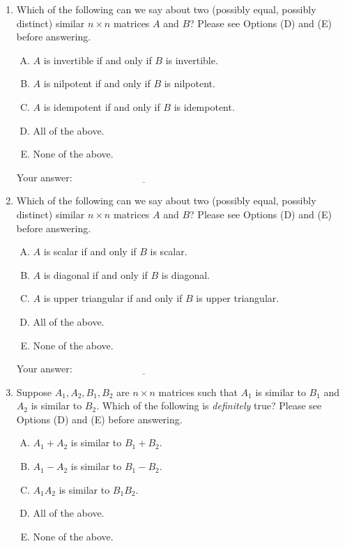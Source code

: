 \documentclass[10pt]{amsart}
\begin{document}
\begin{enumerate}
\item Which of the following can we say about two (possibly equal,
  possibly distinct) similar $n \times n$ matrices $A$ and $B$? Please
  see Options (D) and (E) before answering.

  \begin{enumerate}[(A)]
  \item $A$ is invertible if and only if $B$ is invertible.
  \item $A$ is nilpotent if and only if $B$ is nilpotent.
  \item $A$ is idempotent if and only if $B$ is idempotent.
  \item All of the above.
  \item None of the above.
  \end{enumerate}

  \vspace{0.1in}
  Your answer: $\underline{\qquad\qquad\qquad\qquad\qquad\qquad\qquad}$
  \vspace{0.1in}

\item Which of the following can we say about two (possibly equal,
  possibly distinct) similar $n \times n$ matrices $A$ and $B$? Please
  see Options (D) and (E) before answering.

  \begin{enumerate}[(A)]
  \item $A$ is scalar if and only if $B$ is scalar.
  \item $A$ is diagonal if and only if $B$ is diagonal.
  \item $A$ is upper triangular if and only if $B$ is upper triangular.
  \item All of the above.
  \item None of the above.
  \end{enumerate}

  \vspace{0.1in}
  Your answer: $\underline{\qquad\qquad\qquad\qquad\qquad\qquad\qquad}$
  \vspace{0.1in}

\item Suppose $A_1,A_2,B_1,B_2$ are $n \times n$ matrices such that
  $A_1$ is similar to $B_1$ and $A_2$ is similar to $B_2$. Which of
  the following is {\em definitely} true? Please see Options (D) and
  (E) before answering.

  \begin{enumerate}[(A)]
  \item $A_1 + A_2$ is similar to $B_1 + B_2$.
  \item $A_1 - A_2$ is similar to $B_1 - B_2$.
  \item $A_1A_2$ is similar to $B_1B_2$.
  \item All of the above.
  \item None of the above.
  \end{enumerate}


\end{enumerate}
\end{document}
